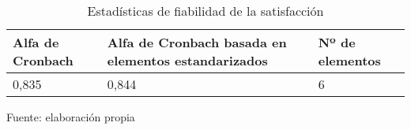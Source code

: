 \begin{table}[h]
    \caption {Estadísticas de fiabilidad de la satisfacción}
	\label{tab:fiabilidadSatisfaccion}
	\setlength\extrarowheight{5pt}
	
	\begin{tabular}{p{5.7cm} p{4.6cm} p{2.8cm}}
	\toprule
	Alfa de Cronbach	& Alfa de Cronbach basada en elementos estandarizados	& Nº de elementos \\
	\midrule
	0,835				& 0,844					& 6 \\
	\bottomrule
	\end{tabular}
	
	\center
	\footnotesize
	Fuente: elaboración propia
\end{table}
